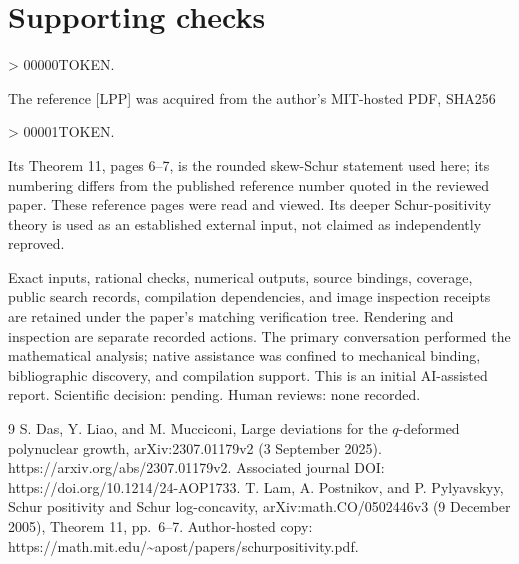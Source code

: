 \documentclass[10pt]{article}
\begin{document}
\section*{Supporting checks}
> 00000TOKEN.\par
The reference [LPP] was acquired from the author’s MIT-hosted PDF, SHA256\par
> 00001TOKEN.\par
Its Theorem 11, pages 6–7, is the rounded skew-Schur statement used here; its numbering differs from the published reference number quoted in the reviewed paper. These reference pages were read and viewed. Its deeper Schur-positivity theory is used as an established external input, not claimed as independently reproved.\par
Exact inputs, rational checks, numerical outputs, source bindings, coverage, public search records, compilation dependencies, and image inspection receipts are retained under the paper’s matching verification tree. Rendering and inspection are separate recorded actions. The primary conversation performed the mathematical analysis; native assistance was confined to mechanical binding, bibliographic discovery, and compilation support. This is an initial AI-assisted report. Scientific decision: pending. Human reviews: none recorded.\par
9 S. Das, Y. Liao, and M. Mucciconi, Large deviations for the \(q\)-deformed polynuclear growth, arXiv:2307.01179v2 (3 September 2025). https://arxiv.org/abs/2307.01179v2. Associated journal DOI: https://doi.org/10.1214/24-AOP1733. T. Lam, A. Postnikov, and P. Pylyavskyy, Schur positivity and Schur log-concavity, arXiv:math.CO/0502446v3 (9 December 2005), Theorem 11, pp. 6–7. Author-hosted copy: https://math.mit.edu/\textasciitilde{}apost/papers/schurpositivity.pdf.\par
\end{document}
